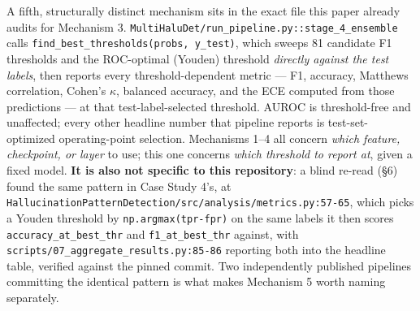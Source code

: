 \documentclass[10pt]{article} %
\begin{document}
A fifth, structurally distinct mechanism sits in the exact file this paper
already audits for Mechanism 3.
\texttt{MultiHaluDet/run\_pipeline.py::stage\_4\_ensemble} calls
\texttt{find\_best\_thresholds(probs, y\_test)}, which sweeps 81 candidate F1
thresholds and the ROC-optimal (Youden) threshold \emph{directly against the
test labels}, then reports every threshold-dependent metric --- F1, accuracy,
Matthews correlation, Cohen's $\kappa$, balanced accuracy, and the ECE computed
from those predictions --- at that test-label-selected threshold. AUROC is
threshold-free and unaffected; every other headline number that pipeline
reports is test-set-optimized operating-point selection. Mechanisms 1--4 all
concern \emph{which feature, checkpoint, or layer} to use; this one concerns
\emph{which threshold to report at}, given a fixed model. \textbf{It is also
not specific to this repository}: a blind re-read (§6) found the same pattern
in Case Study 4's, at
\texttt{HallucinationPatternDetection/src/analysis/metrics.py:57-65}, which
picks a Youden threshold by \texttt{np.argmax(tpr-fpr)} on the same labels it
then scores \texttt{accuracy\_at\_best\_thr} and \texttt{f1\_at\_best\_thr}
against, with \texttt{scripts/07\_aggregate\_results.py:85-86} reporting both
into the headline table, verified against the pinned commit. Two independently
published pipelines committing the identical pattern is what makes Mechanism 5
worth naming separately.
\end{document}
